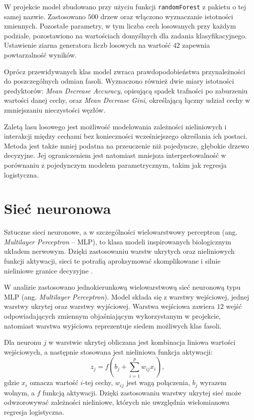 \documentclass{report}
\begin{document}
W projekcie model zbudowano przy użyciu funkcji \texttt{randomForest} z pakietu o tej samej nazwie. Zastosowano $500$ drzew oraz włączono wyznaczanie istotności zmiennych. Pozostałe parametry, w tym liczba cech losowanych przy każdym podziale, pozostawiono na wartościach domyślnych dla zadania klasyfikacyjnego. Ustawienie ziarna generatora liczb losowych na wartość $42$ zapewnia powtarzalność wyników.

Oprócz przewidywanych klas model zwraca prawdopodobieństwa przynależności do poszczególnych odmian fasoli. Wyznaczono również dwie miary istotności predyktorów: \textit{Mean Decrease Accuracy}, opisującą spadek trafności po zaburzeniu wartości danej cechy, oraz \textit{Mean Decrease Gini}, określającą łączny udział cechy w zmniejszaniu nieczystości węzłów.

Zaletą lasu losowego jest możliwość modelowania zależności nieliniowych i interakcji między cechami bez konieczności wcześniejszego określania ich postaci. Metoda jest także mniej podatna na przeuczenie niż pojedyncze, głębokie drzewo decyzyjne. Jej ograniczeniem jest natomiast mniejsza interpretowalność w porównaniu z pojedynczym modelem parametrycznym, takim jak regresja logistyczna.


\section{Sieć neuronowa}
Sztuczne sieci neuronowe, a w szczególności wielowarstwowy perceptron (ang. \textit{Multilayer Perceptron} -- MLP), to klasa modeli inspirowanych biologicznym układem nerwowym. Dzięki zastosowaniu warstw ukrytych oraz nieliniowych funkcji aktywacji, sieci te potrafią aproksymować skomplikowane i silnie nieliniowe granice decyzyjne \cite{hastie2009, koronacki2005}.

W analizie zastosowano jednokierunkową wielowarstwową sieć neuronową typu MLP (ang. \textit{Multilayer Perceptron}). Model składa się z warstwy wejściowej, jednej warstwy ukrytej oraz warstwy wyjściowej. Warstwa wejściowa zawiera $12$ wejść odpowiadających zmiennym objaśniającym wykorzystanym w projekcie, natomiast warstwa wyjściowa reprezentuje siedem możliwych klas fasoli.

Dla neuronu $j$ w warstwie ukrytej obliczana jest kombinacja liniowa wartości wejściowych, a następnie stosowana jest nieliniowa funkcja aktywacji:
\[
z_j=f\left(b_j+\sum_{i=1}^{p}w_{ij}x_i\right),
\]
gdzie $x_i$ oznacza wartość $i$-tej cechy, $w_{ij}$ jest wagą połączenia, $b_j$ wyrazem wolnym, a $f$ funkcją aktywacji. Dzięki zastosowaniu warstwy ukrytej sieć może odwzorowywać zależności nieliniowe, których nie uwzględnia wielomianowa regresja logistyczna.
\end{document}
